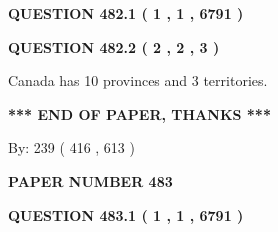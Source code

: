 \documentclass[12pt]{article}
\begin{document}
   
 \vspace{0.2in}
 
 
 
 
   
   
  
\vspace{0.2in}
  
{\textbf{\Large{QUESTION
482.1 
 ( 1 , 1 , 6791 )
}}}
  
  
  
\vspace{0.2in}
  
{\textbf{\Large{QUESTION
482.2 
 ( 2 , 2 , 3 )
}}}
  
  
 
 
\noindent{}
 
 
Canada has 10  provinces and 3 territories.
 
 
 
 
   
   
 \vspace{0.2in}
 
   
   
   
   
\vspace{1.0in} 
{\textbf{\large{ *** END OF PAPER, THANKS *** }}} 
   
   
\hspace{1.0in} By: 
 239 ( 416 ,  613 )
   
   
   
   
\newpage 
\setcounter{page}{ 
   483001 } 
   
   
   
   
 {\textbf{ \Large{ PAPER NUMBER  483  }}}
   
   
\vspace{0.2in}
   
   
   
   
   
   
 \vspace{0.2in}
 
 
 
 
   
   
  
\vspace{0.2in}
  
{\textbf{\Large{QUESTION
483.1 
 ( 1 , 1 , 6791 )
}}}
  
  
  
\end{document}
